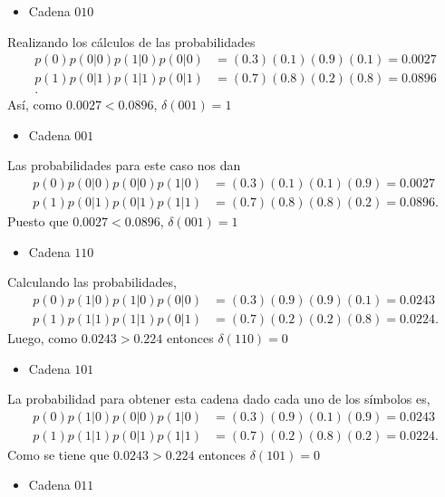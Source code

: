 \begin{sol}
\begin{itemize}
    \item Cadena $010$
\end{itemize}
Realizando los cálculos de las probabilidades
\begin{align*}
p(0) p(0 | 0) p(1 | 0) p(0 | 0) &= (0.3)(0.1)(0.9)(0.1) = 0.0027\\
    p(1) p(0 | 1) p(1 | 1) p(0 | 1) &= (0.7)(0.8)(0.2)(0.8) = 0.0896\\
.\end{align*}
Así, como $0.0027<0.0896$, $\delta(001)=1$

\begin{itemize}
    \item Cadena $001$
\end{itemize}
Las probabilidades para este caso nos dan 
\begin{align*}
    p(0) p(0 | 0) p(0 | 0) p(1 | 0) &= (0.3)(0.1)(0.1)(0.9) = 0.0027\\
    p(1) p(0 | 1) p(0 | 1) p(1 | 1) &= (0.7)(0.8)(0.8)(0.2) = 0.0896
.\end{align*}
Puesto que $0.0027<0.0896$, $\delta(001)=1$

\begin{itemize}
    \item Cadena $110$
\end{itemize}
Calculando las probabilidades,
\begin{align*}
    p(0) p(1 | 0) p(1 | 0) p(0 | 0) &= (0.3)(0.9)(0.9)(0.1) = 0.0243\\
    p(1) p(1 | 1) p(1 | 1) p(0 | 1) &= (0.7)(0.2)(0.2)(0.8) = 0.0224
.\end{align*}
Luego, como $0.0243> 0.224$ entonces $\delta(110)=0$


\begin{itemize}
    \item Cadena $101$
\end{itemize}
La probabilidad para obtener esta cadena dado cada uno de los símbolos es,
\begin{align*}
    p(0) p(1 | 0) p(0 | 0) p(1 | 0) &= (0.3)(0.9)(0.1)(0.9) = 0.0243\\
    p(1) p(1 | 1) p(0 | 1) p(1 | 1) &= (0.7)(0.2)(0.8)(0.2) = 0.0224
.\end{align*}
Como se tiene que $0.0243> 0.224$ entonces $\delta(101)=0$


\begin{itemize}
    \item Cadena $011$
\end{itemize}


\end{sol}
